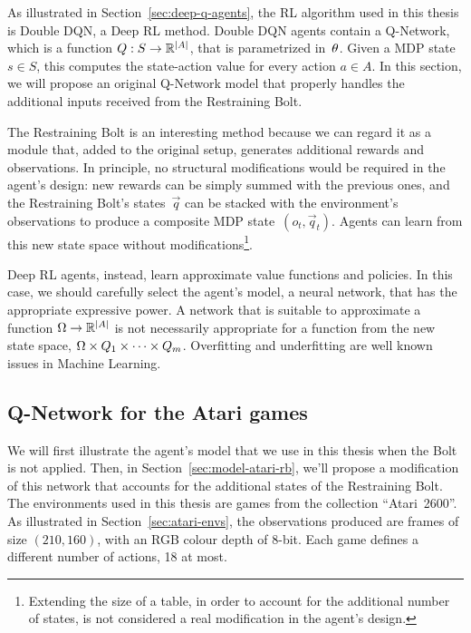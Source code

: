 As illustrated in Section~\ref{sec:deep-q-agents}, the RL algorithm used in
this thesis is Double DQN, a Deep RL method. Double DQN agents contain a
Q-Network, which is a function $Q: S \to \mathbb{R}^{\lvert A\rvert}$, that is parametrized
in~$\theta$. Given a MDP state~$s \in S$, this computes the state-action
value for every action $a \in A$. In this section, we will propose an original
Q-Network model that properly handles the additional inputs received from the
Restraining Bolt.

The Restraining Bolt is an interesting method because we can regard it as a
module that, added to the original setup, generates additional rewards and
observations. In principle, no structural modifications would be required in
the agent's design: new rewards can be simply summed with the previous ones,
and the Restraining Bolt's states~$\vec{q}$ can be stacked with the
environment's observations to produce a composite MDP state~$(o_t,
\vec{q}_t)$. Agents can learn from this new state space without
modifications\footnote{Extending the size of a table, in order to account for
the additional number of states, is not considered a real modification in the
agent's design.}.

Deep RL agents, instead, learn approximate value functions and policies. In
this case, we should carefully select the agent's model, a neural network,
that has the appropriate expressive power. A network that is suitable to
approximate a function $\Omega \to \mathbb{R}^{\lvert A\rvert}$ is not necessarily appropriate
for a function from the new state space, $\Omega \times Q_1 \times \dots \times
Q_m$. Overfitting and underfitting are well known issues in Machine Learning.


\subsection{Q-Network for the Atari games}

\label{sec:model-atari}

We will first illustrate the agent's model that we use in this thesis when the
Bolt is not applied. Then, in Section~\ref{sec:model-atari-rb}, we'll propose
a modification of this network that accounts for the additional states of the
Restraining Bolt.  The environments used in this thesis are games from the
collection ``Atari~2600''.  As illustrated in Section~\ref{sec:atari-envs},
the observations produced are frames of size $(210, 160)$, with an RGB colour
depth of 8-bit. Each game defines a different number of actions, 18 at most.

